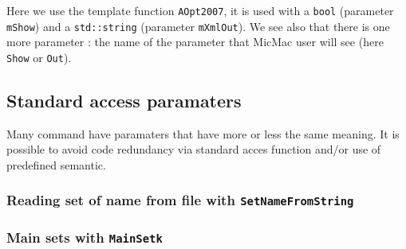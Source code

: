 Here we use the template function {\tt AOpt2007},
it is used with a {\tt bool} (parameter {\tt mShow})
and a {\tt std::string} (parameter {\tt mXmlOut}).
We see also that there is one more parameter : the name of the 
parameter that MicMac user will see (here {\tt Show} or {\tt Out}).


\subsection{Standard access paramaters}

Many command have paramaters that have more or less the
same meaning. It is possible to avoid code redundancy
via standard acces function and/or use of predefined semantic.

\subsubsection{Reading set of name from file with {\tt  SetNameFromString}}
\subsubsection{Main sets with {\tt MainSetk}}




